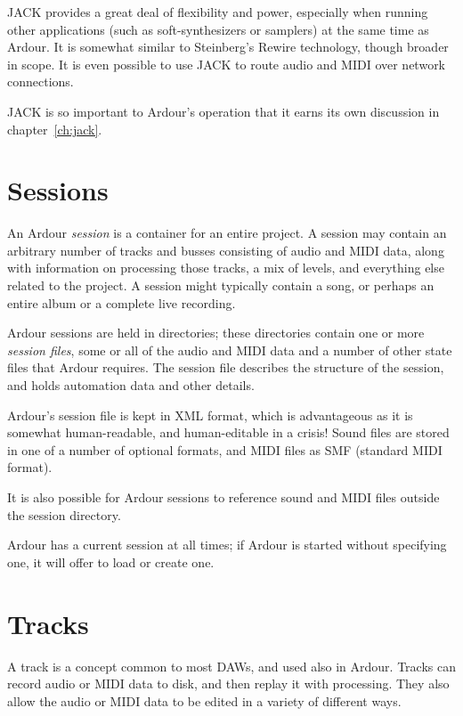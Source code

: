 \documentclass[10pt,a4paper]{book}
\begin{document}
JACK provides a great deal of flexibility and power, especially when
running other applications (such as soft-synthesizers or samplers) at
the same time as Ardour.  It is somewhat similar to Steinberg's Rewire
technology, though broader in scope.  It is even possible to use JACK
to route audio and MIDI over network connections.

JACK is so important to Ardour's operation that it earns its own
discussion in chapter~\ref{ch:jack}.


\section{Sessions}

An Ardour \emph{session} is a container for an entire project.  A
session may contain an arbitrary number of tracks and busses
consisting of audio and MIDI data, along with information on processing
those tracks, a mix of levels, and everything else related to the
project.  A session might typically contain a song, or perhaps an entire
album or a complete live recording.

Ardour sessions are held in directories; these directories contain one
or more \emph{session files}, some or all of the audio and MIDI data
and a number of other state files that Ardour requires.  The session
file describes the structure of the session, and holds automation data
and other details.

\begin{danger}
Ardour's session file is kept in XML format, which is advantageous as
it is somewhat human-readable, and human-editable in a crisis!  Sound
files are stored in one of a number of optional formats, and MIDI
files as SMF (standard MIDI format).

It is also possible for Ardour sessions to reference sound and MIDI
files outside the session directory.
\end{danger}

Ardour has a current session at all times; if Ardour is started without
specifying one, it will offer to load or create one.



\section{Tracks}

A track is a concept common to most DAWs, and used also in Ardour.
Tracks can record audio or MIDI data to disk, and then replay it with
processing.  They also allow the audio or MIDI data to be edited in a
variety of different ways.
\end{document}
